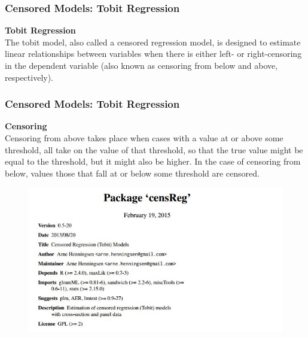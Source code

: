 \documentclass{beamer}
\begin{document}
\begin{frame}
	\frametitle{Censored Models: Tobit Regression}
	\textbf{Tobit Regression}\\
	The tobit model, also called a censored regression model, is designed to estimate linear relationships between 
	variables when there is either left- or right-censoring in the dependent variable (also known as censoring from below and 
	above, respectively). 
\end{frame}
\begin{frame}
	\frametitle{Censored Models: Tobit Regression}
	\textbf{Censoring}\\
	Censoring from above takes place when cases with a value at or above some threshold, all take on the value of 
	that threshold, so that the true value might be equal to the threshold, but it might also be higher. 
	In the case of censoring from below, values those that fall at or below some threshold are censored.
\end{frame}
\begin{frame}
	\begin{figure}
		\centering
		\includegraphics[width=1.1\linewidth]{images/CRAN-censreg}
		
	\end{figure}
	
\end{frame}
\end{document}
